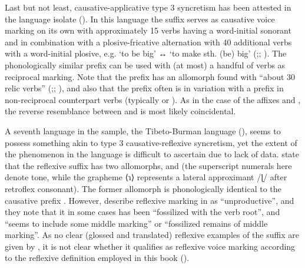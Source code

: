 \newpage

Last but not least, causative-applicative type 3 syncretism has been attested in the language isolate  (). In this language the suffix  serves as causative voice marking on its own with approximately 15 verbs having a word-initial sonorant and in combination with a plosive-fricative alternation with 40 additional verbs with a word-initial plosive, e.g.  ‘to be big’ ↔  ‘to make sth. (be) big’ (\citealt[1721f.]{otaina:nedjalkov:2007};; \citealt[132f.]{nedjalkov:otaina:2013}). The phonologically similar prefix  can be used with (at most) a handful of verbs as reciprocal marking. Note that the prefix  has an allomorph  found with “about 30 relic verbs” (\citealt[1726ff.]{otaina:nedjalkov:2007};; \citealt[107f.]{nedjalkov:otaina:2013}), and also that the prefix often is in variation with a prefix in non-reciprocal counterpart verbs (typically  or ). As in the case of the  affixes  and , the reverse resemblance between   and  is most likely coincidental. 

A seventh language in the sample, the Tibeto-Burman language  (), seems to possess something akin to type 3 causative-reflexive syncretism, yet the extent of the phenomenon in the language is difficult to ascertain due to lack of data. \cite[24, 82]{sun:liu:2009} state that the reflexive suffix  has two allomorphs,  and  (the superscript numerals here denote tone, while the grapheme ⟨ɿ⟩ represents a lateral approximant /ɭ/ after retroflex consonant). The former allomorph  is phonologically identical to the causative prefix . However, \cite[82]{sun:liu:2009} describe reflexive marking in  as “unproductive”, and they note that it in some cases has been “fossilized with the verb root”, and “seems to include some middle marking” or “fossilized remains of middle marking”. As no clear (glossed and translated) reflexive examples of the suffix  are given by \citeauthor{sun:liu:2009}, it is not clear whether it qualifies as reflexive voice marking according to the reflexive definition employed in this book (). 